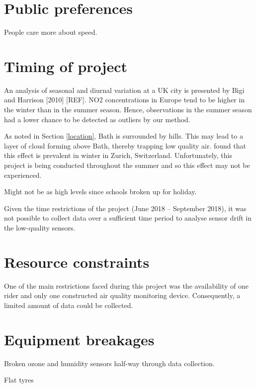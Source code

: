 \documentclass[11pt,twosided,a4paper]{report}
\begin{document}
\section{Public preferences}

People care more about speed.

\section{Timing of project}

An analysis of seasonal and diurnal variation at a UK city is presented by Bigi and Harrison [2010] [REF]. NO2 concentrations in Europe tend to be higher in the winter than in the summer season. Hence, observations in the summer season had a lower chance to be detected as outliers by our method.

As noted in Section \ref{location}, Bath is surrounded by hills. This may lead to a layer of cloud forming above Bath, thereby trapping low quality air. \cite{Hasenfratz2015highresmapsTram} found that this effect is prevalent in winter in Zurich, Switzerland. Unfortunately, this project is being conducted throughout the summer and so this effect may not be experienced. 

Might not be as high levels since schools broken up for holiday.

Given the time restrictions of the project (June 2018 -- September 2018), it was not possible to collect data over a sufficient time period to analyse sensor drift in the low-quality sensors.

\section{Resource constraints}

One of the main restrictions faced during this project was the availability of one rider and only one constructed air quality monitoring device. Consequently, a limited amount of data could be collected.

\section{Equipment breakages}

Broken ozone and humidity sensors half-way through data collection.

Flat tyres



\end{document}
